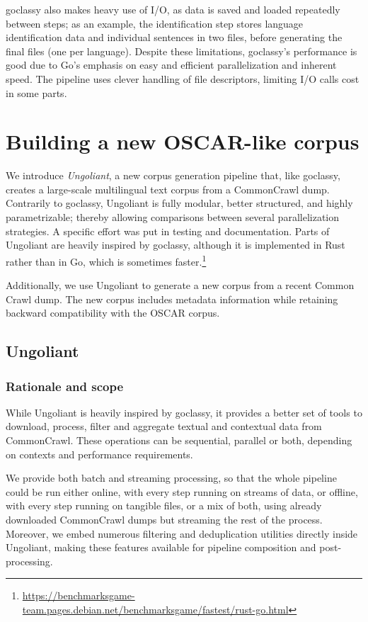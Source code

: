 goclassy also makes heavy use of I/O, as data is saved and loaded repeatedly between steps; as an example, the identification step stores language identification data and individual sentences in two files, before generating the final files (one per language). Despite these limitations, goclassy's performance is good due to Go's emphasis on easy and efficient parallelization and inherent speed. The pipeline uses clever handling of file descriptors, limiting I/O calls cost in some parts.

\section{Building a new OSCAR-like corpus}

We introduce \emph{Ungoliant}, a new corpus generation pipeline that, like goclassy, creates a large-scale multilingual text corpus from a CommonCrawl dump. Contrarily to goclassy, Ungoliant is fully modular, better structured, and highly parametrizable; thereby allowing comparisons between several parallelization strategies. A specific effort was put in testing and documentation. Parts of Ungoliant are heavily inspired by goclassy, although it is implemented in Rust rather than in Go, which is sometimes faster.\footnote{\url{https://benchmarksgame-team.pages.debian.net/benchmarksgame/fastest/rust-go.html}}

Additionally, we use Ungoliant to generate a new corpus from a recent Common Crawl dump. The new corpus includes metadata information while retaining backward compatibility with the OSCAR corpus.


\subsection{Ungoliant}

\subsubsection{Rationale and scope}
\label{subsubsec:rationale}
While Ungoliant is heavily inspired by goclassy, it provides a better set of tools to download, process, filter and aggregate textual and contextual data from CommonCrawl. These operations can be sequential, parallel or both, depending on contexts and performance requirements.

We provide both batch and streaming processing, so that the whole pipeline could be run either online, with every step running on streams of data, or offline, with every step running on tangible files, or a mix of both, using already downloaded CommonCrawl dumps but streaming the rest of the process. Moreover, we embed numerous filtering and deduplication utilities directly inside Ungoliant, making these features available for pipeline composition and post-processing.

